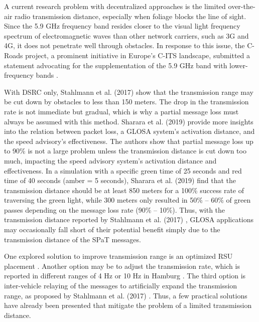 A current research problem with decentralized approaches is the limited over-the-air radio transmission distance, especially when foliage blocks the line of sight. Since the 5.9 GHz frequency band resides closer to the visual light frequency spectrum of electromagnetic waves than other network carriers, such as 3G and 4G, it does not penetrate well through obstacles.  In response to this issue, the C-Roads project, a prominent initiative in Europe's C-ITS landscape, submitted a statement advocating for the supplementation of the 5.9 GHz band with lower-frequency bands \cite{bohm_radio_2017}.

With DSRC only, Stahlmann et al. (2017) \cite{stahlmann_multi-hop_2017} show that the transmission range may be cut down by obstacles to less than 150 meters. The drop in the transmission rate is not immediate but gradual, which is why a partial message loss must always be assumed with this method. Sharara et al. (2019) \cite{sharara_impact_2019} provide more insights into the relation between packet loss, a GLOSA system's activation distance, and the speed advisory's effectiveness. The authors show that partial message loss up to 90\% is not a large problem unless the transmission distance is cut down too much, impacting the speed advisory system's activation distance and effectiveness. In a simulation with a specific green time of 25 seconds and red time of 40 seconds (amber = 5 seconds), Sharara et al. (2019) \cite{sharara_impact_2019} find that the transmission distance should be at least 850 meters for a 100\% success rate of traversing the green light, while 300 meters only resulted in 50\% -- 60\% of green passes depending on the message loss rate (90\% -- 10\%). Thus, with the transmission distance reported by Stahlmann et al. (2017) \cite{stahlmann_multi-hop_2017}, GLOSA applications may occasionally fall short of their potential benefit simply due to the transmission distance of the SPaT messages.

One explored solution to improve transmission range is an optimized RSU placement \cite{mehar_optimized_2015, massobrio_smart_2015, al-ezaly_optimal_2020}. Another option may be to adjust the transmission rate, which is reported in different ranges of 4 Hz \cite{stahlmann_multi-hop_2017} or 10 Hz in Hamburg \cite{stegen_ideas_2021}. The third option is inter-vehicle relaying of the messages to artificially expand the transmission range, as proposed by Stahlmann et al. (2017) \cite{stahlmann_multi-hop_2017}. Thus, a few practical solutions have already been presented that mitigate the problem of a limited transmission distance.

